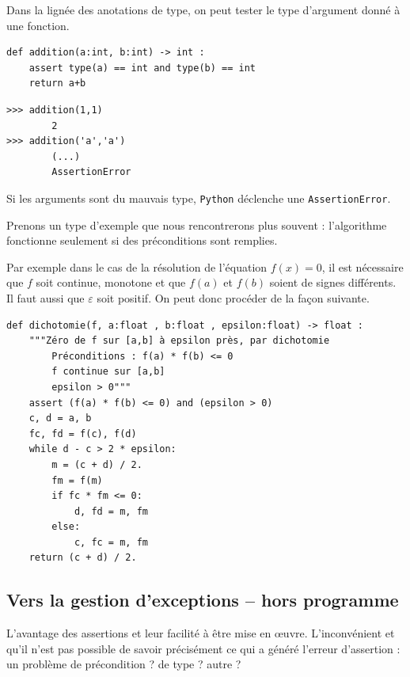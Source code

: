 \begin{exemple}
Dans la lignée des anotations de type, on peut tester le type d'argument donné à une fonction. 
\begin{minipage}[c]{.45\linewidth}
\begin{lstlisting}
def addition(a:int, b:int) -> int : 
    assert type(a) == int and type(b) == int
    return a+b
\end{lstlisting}
\end{minipage} \hfill
\begin{minipage}[c]{.45\linewidth}
\begin{lstlisting}
>>> addition(1,1)
        2
>>> addition('a','a')
        (...)
        AssertionError
\end{lstlisting}
\end{minipage} 

Si les arguments sont du mauvais type, \texttt{Python} déclenche une \texttt{AssertionError}.
\end{exemple}


\begin{exemple} Prenons un type d'exemple que nous rencontrerons plus souvent : l'algorithme fonctionne seulement si des préconditions sont remplies. 

Par exemple dans le cas de la résolution de l'équation $f(x)=0$, il est nécessaire que $f$ soit continue, monotone et que $f(a)$ et $f(b)$ soient de signes différents. Il faut aussi que $\varepsilon$ soit positif. On peut donc procéder de la façon suivante. 

\begin{lstlisting}
def dichotomie(f, a:float , b:float , epsilon:float) -> float :
    """Zéro de f sur [a,b] à epsilon près, par dichotomie
        Préconditions : f(a) * f(b) <= 0
        f continue sur [a,b]
        epsilon > 0"""
    assert (f(a) * f(b) <= 0) and (epsilon > 0)
    c, d = a, b
    fc, fd = f(c), f(d)
    while d - c > 2 * epsilon:
        m = (c + d) / 2.
        fm = f(m)
        if fc * fm <= 0:
            d, fd = m, fm
        else:
            c, fc = m, fm
    return (c + d) / 2.
\end{lstlisting}
\end{exemple}

\subsection{Vers la gestion d'exceptions -- hors programme}
L'avantage des assertions et leur facilité à être mise en \oe{}uvre. L'inconvénient et qu'il n'est pas possible de savoir précisément ce qui a généré l'erreur d'assertion : un problème de précondition ? de type ? autre ?

